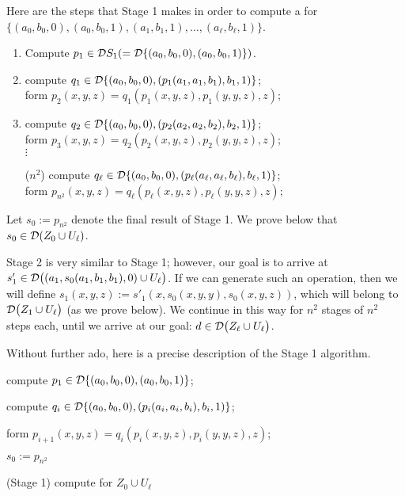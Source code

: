 Here are the steps that Stage 1 makes in order to compute a \ldto for 
$\{(a_0, b_0,0),(a_0, b_0,1),(a_1, b_1,1), \dots, (a_{\ell}, b_{\ell},1)\}$.
\begin{enumerate}
  \item Compute $p_1 \in \mathcal{D} S_1 ( = \mathcal{D} \{(a_0, b_0, 0), (a_0, b_0, 1)\})$.    
  \item compute $q_1\in \mathcal{D} \{(a_0, b_0, 0), (p_1(a_1, a_1, b_1), b_1, 1)\}$; \\
  form $p_2(x,y,z) = q_1(p_1(x,y,z), p_1(y,y,z), z)$; %
  \item compute $q_2\in \mathcal{D} \{(a_0, b_0, 0), (p_2(a_2, a_2, b_2), b_2, 1)\}$; \\
    form $p_3(x,y,z) = q_2(p_2(x,y,z), p_2(y,y,z), z)$;\\ %
  $\vdots$
  \item[($n^2$)] compute $q_{\ell}\in \mathcal{D} \{(a_0, b_0, 0),  (p_{\ell}(a_{\ell}, a_{\ell}, b_{\ell}), b_{\ell}, 1)\}$; \\
  form
  $p_{n^2}(x,y,z) = q_{\ell}(p_{\ell}(x,y,z), p_{\ell}(y,y,z), z)$;
\end{enumerate}
Let $s_0 := p_{n^2}$ denote the final result of Stage 1.
We prove below that $s_0 \in \mathcal{D} (Z_0 \cup U_\ell)$.

Stage 2 is very similar to Stage 1; however, our goal is to arrive at $s'_1 \in 
\mathcal{D} \bigl((a_1, s_0(a_1, b_1, b_1), 0) \cup U_{\ell}\bigr)$. If we can generate 
such an operation, then we will define $s_1(x,y,z) := s'_1(x, s_0(x,y,y), s_0(x,y,z))$, which will
belong to $\mathcal{D} \bigl(Z_1 \cup U_{\ell}\bigr)$ (as we prove below).
We continue in this way for $n^2$ stages of $n^2$ steps each, until we arrive at 
our goal: $d \in \mathcal{D} \bigl(Z_{\ell} \cup U_{\ell}\bigr)$.

Without further ado, here is a precise description of the Stage 1 algorithm.
\begin{algorithm}
  
  compute $p_1 \in \mathcal{D} \{(a_0, b_0, 0), (a_0, b_0, 1)\}$;
  
   {
    compute $q_i\in \mathcal{D} \{(a_0, b_0, 0), (p_i(a_i, a_i, b_i), b_i, 1)\}$;
  
    form $p_{i+1}(x,y,z) = q_i(p_i(x,y,z), p_i(y,y,z), z)$;
  }

  \Return $s_0:=p_{n^2}$
  \caption{(Stage 1) compute \ldto for $Z_0 \cup U_{\ell}$\label{alg:new-2-1}}
\end{algorithm}  


